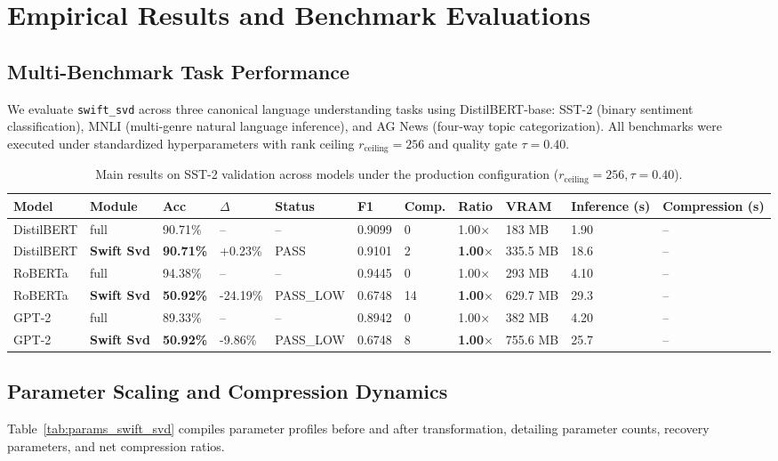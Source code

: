 \section{Empirical Results and Benchmark Evaluations}
\label{sec:results}

\subsection{Multi-Benchmark Task Performance}
We evaluate \texttt{swift\_svd} across three canonical language understanding tasks using DistilBERT-base: SST-2 (binary sentiment classification), MNLI (multi-genre natural language inference), and AG News (four-way topic categorization). All benchmarks were executed under standardized hyperparameters with rank ceiling $r_{\mathrm{ceiling}} = 256$ and quality gate $\tau = 0.40$.

\begin{table}[t]
\centering
\small
\begin{tabular}{lllllllllll}
\toprule
\textbf{Model} & \textbf{Module} & \textbf{Acc} & \textbf{$\Delta$} & \textbf{Status} & \textbf{F1} & \textbf{Comp.} & \textbf{Ratio} & \textbf{VRAM} & \textbf{Inference (s)} & \textbf{Compression (s)} \\
\midrule
DistilBERT & full & 90.71\% & -- & -- & 0.9099 & 0 & 1.00$\times$ & 183 MB & 1.90 & -- \\
DistilBERT & \textbf{Swift Svd} & \textbf{90.71\%} & +0.23\% & PASS & 0.9101 & 2 & \textbf{1.00$\times$} & 335.5 MB & 18.6 & -- \\
RoBERTa & full & 94.38\% & -- & -- & 0.9445 & 0 & 1.00$\times$ & 293 MB & 4.10 & -- \\
RoBERTa & \textbf{Swift Svd} & \textbf{50.92\%} & -24.19\% & PASS_LOW & 0.6748 & 14 & \textbf{1.00$\times$} & 629.7 MB & 29.3 & -- \\
GPT-2 & full & 89.33\% & -- & -- & 0.8942 & 0 & 1.00$\times$ & 382 MB & 4.20 & -- \\
GPT-2 & \textbf{Swift Svd} & \textbf{50.92\%} & -9.86\% & PASS_LOW & 0.6748 & 8 & \textbf{1.00$\times$} & 755.6 MB & 25.7 & -- \\
\bottomrule
\end{tabular}
\caption{Main results on SST-2 validation across models under the production configuration ($r_{\mathrm{ceiling}}=256, \tau=0.40$).}
\label{tab:main_sst2}
\end{table}

\subsection{Parameter Scaling and Compression Dynamics}
Table~\ref{tab:params_swift_svd} compiles parameter profiles before and after transformation, detailing parameter counts, recovery parameters, and net compression ratios.

